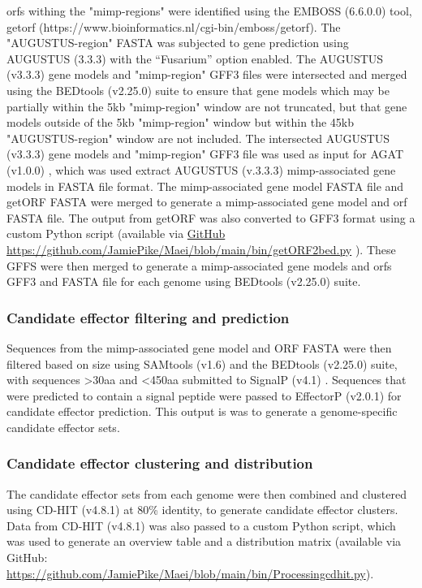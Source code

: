 \Acp{orf} withing the "\ac{mimp}-regions" were identified using the EMBOSS (6.6.0.0) tool, getorf (https://www.bioinformatics.nl/cgi-bin/emboss/getorf). The "AUGUSTUS-region" FASTA was subjected to gene prediction using AUGUSTUS (3.3.3) \parencite{Stanke2006} with the “Fusarium” option enabled. The AUGUSTUS (v3.3.3) gene models and "\ac{mimp}-region" GFF3 files were intersected and merged using the BEDtools (v2.25.0) suite \parencite{Quinlan2010} to ensure that gene models which may be partially within the 5kb "\ac{mimp}-region" window are not truncated, but that gene models outside of the 5kb "\ac{mimp}-region" window but within the 45kb "AUGUSTUS-region" window are not included. The intersected AUGUSTUS (v3.3.3) gene models and "\ac{mimp}-region" GFF3 file was used as input for AGAT (v1.0.0) \parencite{DainatN.D.}, which was used extract AUGUSTUS (v.3.3.3) \ac{mimp}-associated gene models in FASTA file format. The \ac{mimp}-associated gene model FASTA file and getORF FASTA were merged to generate a \ac{mimp}-associated gene model and \ac{orf} FASTA file. The output from getORF was also converted to GFF3 format using a custom Python script (available via \href{https://github.com/JamiePike/Maei/blob/main/bin/getORF2bed.py}{ GitHub https://github.com/JamiePike/Maei/blob/main/bi\-n/getORF2bed.py}
). These GFFS were then merged to generate a \ac{mimp}-associated gene models and \acp{orf} GFF3 and FASTA file for each genome using BEDtools (v2.25.0) suite.

\subsubsection{Candidate effector filtering and prediction}

Sequences from the \ac{mimp}-associated gene model and ORF FASTA were then filtered based on size using SAMtools (v1.6) and the BEDtools (v2.25.0) suite, with sequences >30aa and <450aa submitted to SignalP (v4.1) \parencite{Petersen2011}. Sequences that were predicted to contain a signal peptide were passed to EffectorP (v2.0.1) \parencite{Sperschneider2018} for candidate effector prediction. This output is was to generate a genome-specific candidate effector sets.

\subsubsection{Candidate effector clustering and distribution}

The candidate effector sets from each genome were then combined and clustered using CD-HIT (v4.8.1) \parencite{Fu2012} at 80\% identity, to generate candidate effector clusters. Data from CD-HIT (v4.8.1) was also passed to a custom Python script, which was used to generate an overview table and a distribution matrix (available via GitHub: \href{https://github.com/JamiePike/Maei/blob/main/bin/Processingcdhit.py}{https://github.com/JamiePike/Maei/blob/main/bin/Processingcdhit.py}).

